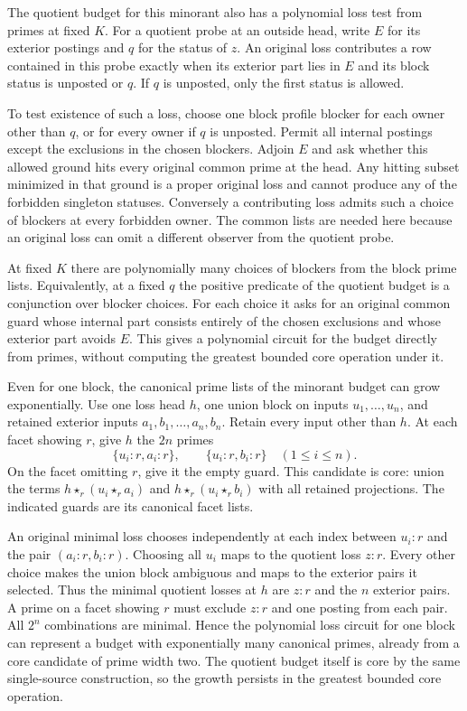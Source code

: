 The quotient budget for this minorant also has a
polynomial loss test from primes at fixed $K$.
For a quotient probe at an outside head, write $E$
for its exterior postings and $q$ for the status of
$z$. An original loss contributes a row contained
in this probe exactly when its exterior part lies
in $E$ and its block status is unposted or $q$.
If $q$ is unposted, only the first status is allowed.

To test existence of such a loss, choose one block
profile blocker for each owner other than $q$, or
for every owner if $q$ is unposted. Permit all
internal postings except the exclusions in the
chosen blockers. Adjoin $E$ and ask whether this
allowed ground hits every original common prime
at the head. Any hitting subset minimized in that
ground is a proper original loss and cannot produce
any of the forbidden singleton statuses. Conversely
a contributing loss admits such a choice of blockers
at every forbidden owner. The common lists are
needed here because an original loss can omit a
different observer from the quotient probe.

At fixed $K$ there are polynomially many choices of
blockers from the block prime lists. Equivalently,
at a fixed $q$ the positive predicate of the
quotient budget is a conjunction over blocker
choices. For each choice it asks for an original
common guard whose internal part consists entirely
of the chosen exclusions and whose exterior part
avoids $E$. This gives a polynomial circuit for the
budget directly from primes, without computing the
greatest bounded core operation under it.

Even for one block, the canonical prime lists of
the minorant budget can grow exponentially. Use one
loss head $h$, one union block on inputs
$u_1,\ldots,u_n$, and retained exterior inputs
$a_1,b_1,\ldots,a_n,b_n$. Retain every input other
than $h$. At each facet showing $r$, give $h$
the $2n$ primes
\[
   \{u_i{:}r,a_i{:}r\},\qquad
   \{u_i{:}r,b_i{:}r\}
   \quad(1\le i\le n).
\]
On the facet omitting $r$, give it the empty guard.
This candidate is core: union the terms
$h\star_r(u_i\star_r a_i)$ and
$h\star_r(u_i\star_r b_i)$ with all retained
projections. The indicated guards are its
canonical facet lists.

An original minimal loss chooses independently at
each index between $u_i{:}r$ and the pair
$(a_i{:}r,b_i{:}r)$. Choosing all $u_i$ maps to
the quotient loss $z{:}r$. Every other choice
makes the union block ambiguous and maps to the
exterior pairs it selected. Thus the minimal
quotient losses at $h$ are $z{:}r$ and the $n$
exterior pairs. A prime on a facet showing $r$
must exclude $z{:}r$ and one posting from each
pair. All $2^n$ combinations are minimal. Hence
the polynomial loss circuit for one block can
represent a budget with exponentially many
canonical primes, already from a core candidate
of prime width two. The quotient budget itself is
core by the same single-source construction, so
the growth persists in the greatest bounded core
operation.


